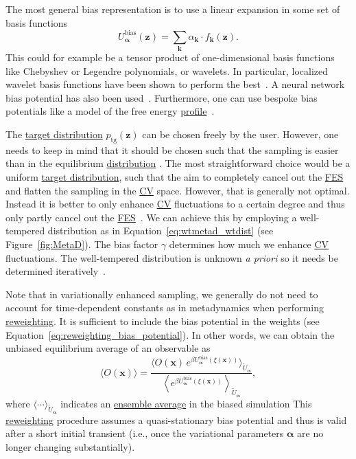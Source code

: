 \documentclass[9pt,review]{livecoms}
\newcommand{\vx}{\mathbf{x}}
\newcommand{\vz}{\mathbf{z}}
\begin{document}
The most general bias representation is to use a linear expansion in some set of basis functions
\begin{equation}
U_{\boldsymbol{\alpha}}^{\mathrm{bias}}(\vz) = \sum_{\mathbf{k}} \alpha_{\mathbf{k}} \cdot f_{\mathbf{k}}(\vz).
\end{equation}
This could for example be a tensor product of one-dimensional basis functions like Chebyshev or Legendre polynomials, or wavelets. In particular, localized wavelet basis functions have been shown to perform the best~\cite{ValssonPampel_Wavelets_2022}. A neural network bias potential has also been used~\cite{Bonati2019_NN-VES}. Furthermore, one can use bespoke bias potentials like a model of the free energy \hyperlink{ref:FES} {profile}~\cite{McCarty2016_JCTC,Piaggi2016_Faraday}.

The \hyperlink{ref:targetdist}{target distribution} $p_{\mathrm{tg}}(\vz)$ can be chosen freely by the user. However, one needs to keep in mind that it should be chosen such that the sampling is easier than in the equilibrium \hyperlink{ref:Distribution} {distribution} . The most straightforward choice would be a uniform \hyperlink{ref:targetdist}{target distribution}, such that the aim to completely cancel out the \hyperlink{ref:FES} {FES} and flatten the sampling in the \hyperlink{ref:CV} {CV} space. However, that is generally not optimal. Instead it is better to only enhance \hyperlink{ref:CV} {CV} fluctuations to a certain degree and thus only partly cancel out the \hyperlink{ref:FES} {FES}~\cite{Valsson-JCTC-2015}. We can achieve this by employing a well-tempered distribution as in Equation~\ref{eq:wtmetad_wtdist} (see Figure~\ref{fig:MetaD}). The bias factor $\gamma$ determines how much we enhance \hyperlink{ref:CV} {CV} fluctuations. The well-tempered distribution is unknown \textit{a priori} so it needs be determined iteratively~\cite{Valsson-JCTC-2015}.

Note that in variationally enhanced sampling, we generally do not need to account for time-dependent constants as in metadynamics when performing \hyperlink{ref:Reweighting} {reweighting}. It is sufficient to include the bias potential in the weights (see Equation~\ref{eq:reweighting_bias_potential}). In other words, we can obtain the unbiased equilibrium average of an observable as 
\begin{equation}
\label{ves_reweighting}
\langle O(\vx) \rangle = \frac{\langle O(\vx)
\,
e^{
\beta
U_{\boldsymbol{\alpha}}^{\mathrm{bias}}(\xi(\vx))
}\rangle_{\tilde U_{\boldsymbol{\alpha}}}}
{\left\langle
e^{\beta 
U_{\boldsymbol{\alpha}}^{\mathrm{bias}}(\xi(\vx))
} \right\rangle_{\tilde U_{\boldsymbol{\alpha}}}}, 
\end{equation}
where $\langle \cdots \rangle_{\tilde U_{\boldsymbol{\alpha}}}$ indicates an \hyperlink{ref:ensemble_average} {ensemble average} in the biased simulation  This \hyperlink{ref:Reweighting} {reweighting} procedure assumes a quasi-stationary bias potential and thus is valid after a short initial transient (i.e., once the variational parameters $\boldsymbol{\alpha}$ are no longer changing substantially). 
\end{document}
